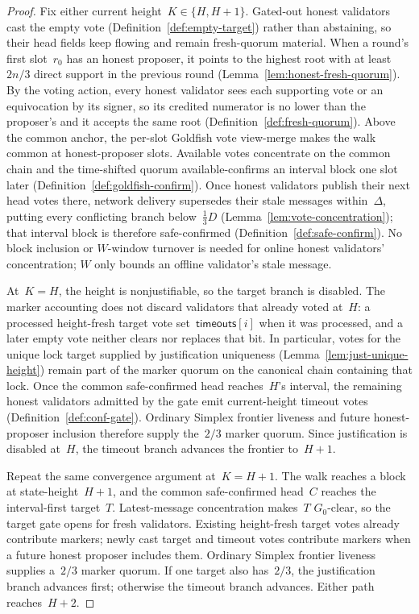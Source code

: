 \ifx\litemode\undefined\documentclass{article}\fi
\newcommand{\timeouts}{\mathsf{timeouts}}
\newcommand{\Dvote}{\ensuremath{D}}         %
\newcommand{\Wvote}{\ensuremath{W}}         %
\newcommand{\Gzero}{\ensuremath{G_{0}}}
\newcommand{\rzero}{\ensuremath{r_{0}}}                 %
\theoremstyle{plain}
\theoremstyle{definition}
\theoremstyle{remark}
\begin{document}
\begin{proof}
Fix either current height~\(K \in \{H,H+1\}\).  Gated-out honest validators
cast the empty vote (Definition~\ref{def:empty-target}) rather than abstaining,
so their head fields keep flowing and remain fresh-quorum material.  When a
round's first slot~\(\rzero\) has an honest proposer, it points to the highest
root with at least~\(2n/3\) direct support in the previous round
(Lemma~\ref{lem:honest-fresh-quorum}).  By the voting action, every honest
validator sees each supporting vote or an equivocation by its signer, so its
credited numerator is no lower than the proposer's and it accepts the same
root (Definition~\ref{def:fresh-quorum}).  Above the common anchor,
the per-slot Goldfish vote view-merge makes the walk common at honest-proposer
slots.  Available votes concentrate on the common chain and the time-shifted
quorum available-confirms an interval block one slot later
(Definition~\ref{def:goldfish-confirm}).  Once honest validators publish their
next head votes there, network delivery supersedes their stale messages
within~\(\Delta\), putting every conflicting branch below~\(\tfrac13\Dvote\)
(Lemma~\ref{lem:vote-concentration}); that interval block is therefore
safe-confirmed (Definition~\ref{def:safe-confirm}).  No block inclusion or
\(\Wvote\)-window turnover is needed for online honest validators'
concentration; \(\Wvote\) only bounds an offline validator's stale message.

At~\(K=H\), the height is nonjustifiable, so the target branch is disabled.
The marker accounting does not discard validators that already voted at~\(H\):
a processed height-fresh target vote set~\(\timeouts[i]\) when it was processed,
and a later empty vote neither clears nor replaces that bit.  In particular,
votes for the unique lock target supplied by justification uniqueness
(Lemma~\ref{lem:just-unique-height}) remain part of the marker quorum on the
canonical chain containing that lock.  Once the common safe-confirmed head
reaches~\(H\)'s interval, the remaining honest validators admitted by the gate
emit current-height timeout votes (Definition~\ref{def:conf-gate}).  Ordinary
Simplex frontier liveness and future honest-proposer inclusion therefore supply
the~\(2/3\) marker quorum.  Since justification is disabled at~\(H\), the timeout
branch advances the frontier to~\(H+1\).

Repeat the same convergence argument at~\(K=H+1\).  The walk reaches a block at
state-height~\(H+1\), and the common safe-confirmed head~\(C\) reaches the
interval-first target~\(T\).  Latest-message concentration makes~\(T\)
\(\Gzero\)-clear, so the target gate opens for fresh validators.  Existing
height-fresh target votes already contribute markers; newly cast target and
timeout votes contribute markers when a future honest proposer includes them.
Ordinary Simplex frontier liveness supplies a~\(2/3\) marker quorum.  If one
target also has~\(2/3\), the justification branch advances first; otherwise the
timeout branch advances.  Either path reaches~\(H+2\).


\end{proof}
\end{document}
